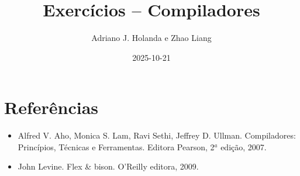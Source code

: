 \documentclass[11pt]{article}
\begin{document}
\title{Exercícios -- Compiladores}
\author{Adriano J. Holanda e Zhao Liang}
\date{2025-10-21}
\maketitle

%


\section*{Referências}
\begin{itemize}
\item Alfred V. Aho, Monica S. Lam, Ravi Sethi, Jeffrey
  D. Ullman. Compiladores: Princípios, Técnicas e Ferramentas. Editora
  Pearson, 2$^a$ edição, 2007.
\item John Levine. Flex \& bison. O'Reilly editora, 2009.
\end{itemize}
\end{document}
